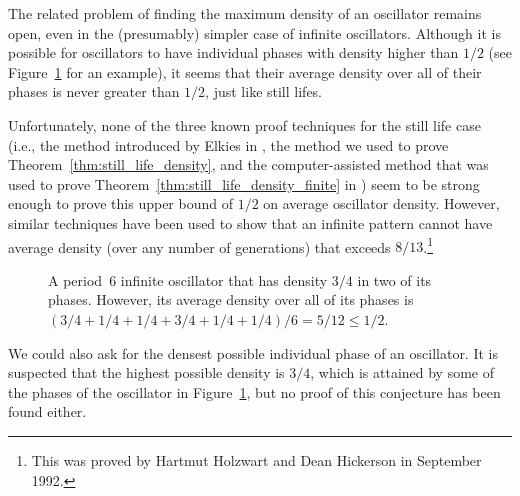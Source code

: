 The related problem of finding the maximum density of an oscillator remains open, even in the (presumably) simpler case of infinite oscillators. Although it is possible for oscillators to have individual phases with density higher than $1/2$ (see Figure~\ref{fig:dense_oscillator} for an example), it seems that their average density over all of their phases is never greater than $1/2$, just like still lifes.

Unfortunately, none of the three known proof techniques for the still life case (i.e., the method introduced by Elkies in \cite{Elk98}, the method we used to prove Theorem~\ref{thm:still_life_density}, and the computer-assisted method that was used to prove Theorem~\ref{thm:still_life_density_finite} in \cite{CS12}) seem to be strong enough to prove this upper bound of $1/2$ on average oscillator density. However, similar techniques have been used to show that an infinite pattern cannot have average density (over any number of generations) that exceeds $8/13$.\footnote{This was proved by Hartmut Holzwart and Dean Hickerson in September 1992.}

\begin{figure}[!htb]
	\centering
	\caption{A period~$6$ infinite oscillator that has density $3/4$ in two of its phases. However, its average density over all of its phases is $(3/4 + 1/4 + 1/4 + 3/4 + 1/4 + 1/4)/6 = 5/12 \leq 1/2$.}\label{fig:dense_oscillator}
\end{figure}

We could also ask for the densest possible individual phase of an oscillator. It is suspected that the highest possible density is $3/4$, which is attained by some of the phases of the oscillator in Figure~\ref{fig:dense_oscillator}, but no proof of this conjecture has been found either.


